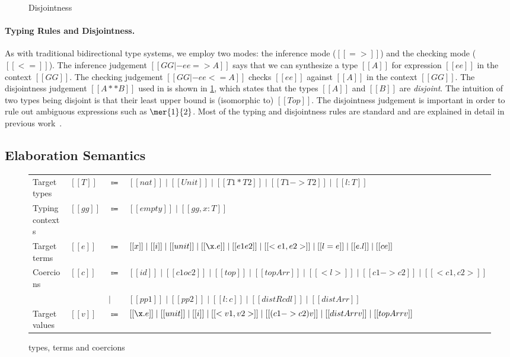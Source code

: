 \begin{figure}[t]
  \centering
  \caption{Disjointness}
  \label{fig:disjoint}
\end{figure}


\paragraph{Typing Rules and Disjointness.}

As with traditional bidirectional type systems, we employ two modes: the
inference mode ($[[=>]]$) and the checking mode ($[[<=]]$). The inference
judgement $[[GG |- ee => A]]$ says that we can synthesize a type $[[A]]$ for
expression $[[ee]]$ in the context $[[GG]]$. The checking judgement $[[GG |- ee
<= A]]$ checks $[[ee]]$ against $[[A]]$ in the context $[[GG]]$. The
disjointness judgement $[[A ** B]]$ used in  is shown in
\cref{fig:disjoint}, which states that the types $[[A]]$ and $[[B]]$ are
\textit{disjoint}. The intuition of two types being disjoint is
that their least upper bound is (isomorphic to) $[[Top]]$. The disjointness judgement is
important in order to rule out ambiguous expressions such as $\mer{1}{2}$. Most
of the typing and disjointness rules are standard and are explained in detail in
previous work~\cite{oliveira2016disjoint, alpuimdisjoint}.


\subsection{Elaboration Semantics}
\label{sec:elaboration}

\begin{figure}[t]
  \centering
\begin{tabular}{llll} \toprule
  Target types & $[[T]]$ & $\Coloneqq$ & $[[nat]] \mid [[Unit]] \mid [[T1 * T2]] \mid [[T1 -> T2]] \mid [[ {l : T} ]]$ \\
  Typing contexts & $[[gg]]$ & $\Coloneqq$ & $[[empty]] \mid [[gg , x : T]]$ \\
  Target terms & $[[e]]$ & $\Coloneqq$ & $[[x]] \mid [[i]] \mid [[unit]] \mid [[\x . e]] \mid [[e1 e2]] \mid [[<e1, e2>]] \mid [[{ l = e }]] \mid [[e.l]] \mid [[c e]]$ \\
  Coercions & $[[c]]$ & $\Coloneqq$ & $ [[id]] \mid [[c1 o c2]] \mid [[top]] \mid [[topArr]] \mid [[< l >]] \mid [[c1 -> c2]] \mid [[<c1, c2>]]$ \\
  &  &  $\mid$ & $  [[pp1]] \mid [[pp2]] \mid [[{l : c}]] \mid  [[ distRcd l ]] \mid [[distArr]]  $ \\
  Target values & $[[v]]$ & $\Coloneqq$ & $[[\x.e]] \mid [[unit]] \mid [[i]] \mid [[<v1, v2>]] \mid [[(c1 -> c2) v]] \mid [[distArr v]] \mid [[topArr v]] $ \\ \bottomrule
\end{tabular}
  \caption{\tname types, terms and coercions}
  \label{fig:target}
\end{figure}

